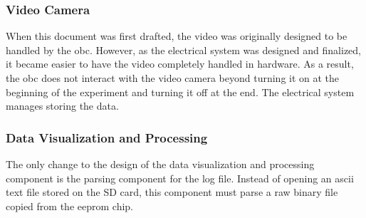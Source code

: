\subsubsection{Video Camera}
When this document was first drafted, the video was originally designed to be
handled by the \gls{obc}.
However, as the electrical system was designed and finalized, it became easier
to have the video completely handled in hardware.
As a result, the \gls{obc} does not interact with the video camera beyond
turning it on at the beginning of the experiment and turning it off at the end.
The electrical system manages storing the data.

\subsubsection{Data Visualization and Processing}
The only change to the design of the data visualization and processing
component is the parsing component for the log file. 
Instead of opening an \gls{ascii} text file stored on the SD card, this
component must parse a raw binary file copied from the \gls{eeprom} chip.
